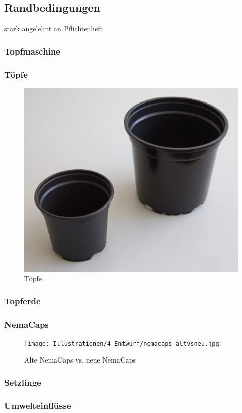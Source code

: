 \subsection{Randbedingungen}
stark angelehnt an Pflichtenheft
\subsubsection{Topfmaschine}

\subsubsection{Töpfe}

\begin{figure}[H]
	\includegraphics[width=1\textwidth]{Illustrationen/4-Entwurf/toepfe.jpg}
	\caption{Töpfe}
	\label{fig:toepfe}
\end{figure}

\subsubsection{Topferde}

\subsubsection{NemaCaps}

\begin{figure}[H]
	\texttt{[image: Illustrationen/4-Entwurf/nemacaps\_altvsneu.jpg]}
	\caption{Alte NemaCaps vs. neue NemaCaps}
	\label{fig:nemacaps_altvsneu}
\end{figure}

\subsubsection{Setzlinge}

\subsubsection{Umwelteinflüsse}
